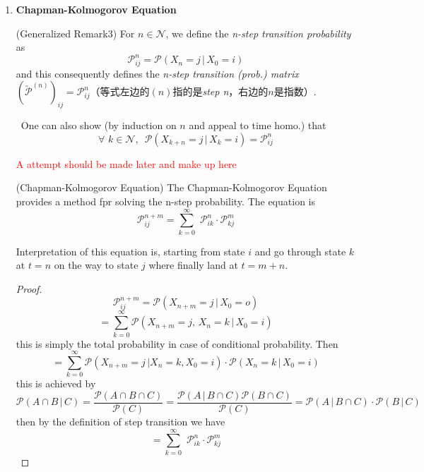 \documentclass[10.5pt]{article}
\newcommand{\prob}[0]{\mathcal{P}}
\newenvironment{changemargin}[2]{%
  \begin{list}{}{%
    \setlength{\topsep}{0pt}%
    \setlength{\leftmargin}{#1}%
    \setlength{\rightmargin}{#2}%
    \setlength{\listparindent}{\parindent}%
    \setlength{\itemindent}{\parindent}%
    \setlength{\parsep}{\parskip}%
  }%
  \item[]}{\end{list}}
\begin{document}
\begin{changemargin}{-0.125in}{0in}
\begin{enumerate}
\begin{enumerate}
       
       \smallskip
       
       \item \textbf{Chapman-Kolmogorov Equation}
       
       \medskip
       
       \begin{definition}(Generalized Remark3) For $n \in \mathcal{N}$, we define the \textit{n-step transition probability} as
       \[
       \mathcal{P}_{ij}^n = \mathcal{P}(X_{n} = j\,|\,X_0 = i)
       \]
       	and this consequently defines the \textit{n-step transition (prob.) matrix} $(\utilde{\mathcal{P}}^{(n)})_{ij} = \mathcal{P}_{ij}^n$（等式左边的$(n)$指的是\textit{step n}，右边的$n$是指数）.
       \end{definition}
       
       \smallskip
       
       \begin{remark}
       	\,\,\,One can also show (by induction on $n$ and appeal to time homo.) that 
        \[
        \forall \,\, k \in \mathcal{N},\,\,\,\mathcal{P}(X_{k+n} = j\,|\,X_k = i) = \mathcal{P}_{ij}^n
        \]
       \end{remark}
       
       \textcolor{red}{A attempt should be made later and make up here}
       
       \smallskip
       
       \begin{definition}(Chapman-Kolmogorov Equation)\,\,The Chapman-Kolmogorov Equation provides a method fpr solving the n-step probability. The equation is 
       \[
       \mathcal{P}^{n+m}_{ij} = \sum_{k = 0}^\infty \,\,\mathcal{P}_{ik}^n\cdot\mathcal{P}_{kj}^m
       \] 
       \end{definition}
       
       Interpretation of this equation is, starting from state $i$ and go through state $k$ at $t=n$ on the way to state $j$ where finally land at $t = m + n$.
       
       \begin{proof}
       \[
       	\mathcal{P}_{ij}^{n + m} = \mathcal{P}(X_{n+m} = j\,|\,X_0 = o)
       	\]
       	\[
       	= \sum_{k = 0}^\infty\mathcal{P}(X_{n+m} = j, \,X_n = k\,|\,X_0 = i)
       	\]
       	this is simply the total probability in case of conditional probability. Then 
       	\[
       	  = \sum_{k = 0}^\infty \mathcal{P}(X_{n+m} = j\,| X_n = k, X_0 = i) \cdot \mathcal{P}(X_n = k\,|\,X_0=i)
       	\]
       	this is achieved by
       	\[
       	\prob(A \cap B \,|\,C) = \frac{\prob (A\cap B\cap C)}{\prob(C)} = \frac{\prob(A\,|\,B\cap C)\prob(B\cap C)}{\prob(C)} = \prob(A\,|\,B\cap C)\cdot \prob(B \,|\,C)
       	\]
       	then by the definition of step transition we have 
       	\[
        = \sum_{k = 0}^\infty \,\,\mathcal{P}_{ik}^n\cdot\mathcal{P}_{kj}^m
       	\]
       \end{proof}
       

\end{enumerate}
\end{enumerate}
\end{changemargin}
\end{document}
